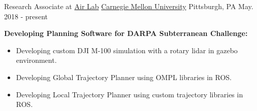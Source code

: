 



\begin{cventries}


  \cventry
    {Research Associate at \href{http://theairlab.org/}{Air Lab}} %
    {\href{https://www.ri.cmu.edu/}{Carnegie Mellon University}} %
    {Pittsburgh, PA} %
    {May. 2018 - present} %
    {
      \begin{cvitems} %
		\item \textbf{Developing Planning Software for DARPA Subterranean Challenge:}
		\begin{itemize}
			\item Developing custom DJI M-100 simulation with a rotary lidar in gazebo environment.
			\item Developing Global Trajectory Planner using OMPL libraries in ROS.
			\item Developing Local Trajectory Planner using custom trajectory libraries in ROS. 
		\end{itemize}	
      \end{cvitems}
    }







\end{cventries}

